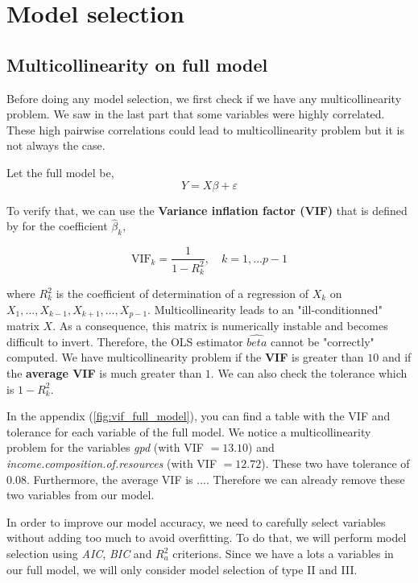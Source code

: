 \section{Model selection}

\subsection{Multicollinearity on full model}

Before doing any model selection, we first check if we have any multicollinearity problem. We saw in the last part that some variables were highly correlated. These high pairwise correlations could lead to multicollinearity problem but it is not always the case.

Let the full model be, 
\begin{equation}
	Y = X\beta + \varepsilon
\end{equation}

To verify that, we can use the \textbf{Variance inflation factor (VIF)} that is defined by for the coefficient $\hat{\beta}_k$,

\begin{equation}
	\text{VIF}_k = \frac{1}{1 - R^2_k}, \quad k = 1,...p-1
\end{equation}

where $R^2_k$ is the coefficient of determination of a regression of $X_k$ on $X_1,\dots,X_{k-1},X_{k+1},\dots,X_{p-1}$. Multicollinearity leads to an "ill-conditionned" matrix $X$. As a consequence, this matrix is numerically instable and becomes difficult to invert. Therefore, the OLS estimator $\hat{beta}$ cannot be "correctly" computed.
We have multicollinearity problem if the \textbf{VIF} is greater than $10$ and if the \textbf{average VIF} is much greater than $1$. We can also check the tolerance which is $1 - R^2_k$.

In the appendix (\ref{fig:vif_full_model}), you can find a table with the VIF and tolerance for each variable of the full model. We notice a multicollinearity problem for the variables \textit{gpd} (with VIF $= 13.10$) and \textit{income.composition.of.resources} (with VIF $= 12.72$). These two have tolerance of $0.08$. Furthermore, the average VIF is $...$. Therefore we can already remove these two variables from our model.

In order to improve our model accuracy, we need to carefully select variables without adding too much to avoid overfitting. To do that, we will perform model selection using \textit{AIC}, \textit{BIC} and \textit{$R^2_a$} criterions. Since we have a lots a variables in our full model, we will only consider model selection of type II and III.

